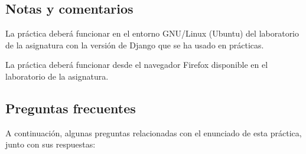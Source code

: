 \subsection{Notas y comentarios}

La práctica deberá funcionar en el entorno GNU/Linux (Ubuntu) del laboratorio de la asignatura con la versión de Django que se ha usado en prácticas.

La práctica deberá funcionar desde el navegador Firefox disponible en el laboratorio de la asignatura.

\subsection{Preguntas frecuentes}
\label{sec:practica-2026-05:preguntas}

A continuación, algunas preguntas relacionadas con el enunciado de esta práctica, junto con sus respuestas:

